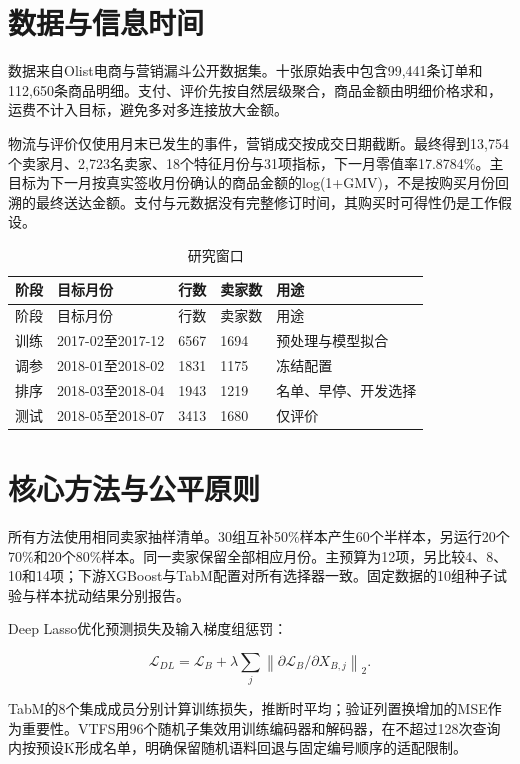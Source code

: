 \documentclass[UTF8,12pt,a4paper]{ctexart}
\begin{document}
\section{数据与信息时间}

数据来自Olist电商与营销漏斗公开数据集\cite{olist2018,funnel2018}。十张原始表中包含99,441条订单和112,650条商品明细。支付、评价先按自然层级聚合，商品金额由明细价格求和，运费不计入目标，避免多对多连接放大金额。

物流与评价仅使用月末已发生的事件，营销成交按成交日期截断。最终得到13,754个卖家月、2,723名卖家、18个特征月份与31项指标，下一月零值率17.8784\%。主目标为下一月按真实签收月份确认的商品金额的log(1+GMV)，不是按购买月份回溯的最终送达金额。支付与元数据没有完整修订时间，其购买时可得性仍是工作假设。

{
\footnotesize
\begin{longtable}[]{@{}lllll@{}}
\caption{研究窗口}\tabularnewline
\toprule\noalign{}
阶段 & 目标月份 & 行数 & 卖家数 & 用途 \\
\midrule\noalign{}
\endfirsthead
\toprule\noalign{}
阶段 & 目标月份 & 行数 & 卖家数 & 用途 \\
\midrule\noalign{}
\endhead
\bottomrule\noalign{}
\endlastfoot
训练 & 2017-02至2017-12 & 6567 & 1694 & 预处理与模型拟合 \\
调参 & 2018-01至2018-02 & 1831 & 1175 & 冻结配置 \\
排序 & 2018-03至2018-04 & 1943 & 1219 & 名单、早停、开发选择 \\
测试 & 2018-05至2018-07 & 3413 & 1680 & 仅评价 \\
\end{longtable}
}

\section{核心方法与公平原则}

所有方法使用相同卖家抽样清单。30组互补50\%样本产生60个半样本，另运行20个70\%和20个80\%样本。同一卖家保留全部相应月份。主预算为12项，另比较4、8、10和14项；下游XGBoost与TabM配置对所有选择器一致。固定数据的10组种子试验与样本扰动结果分别报告。

Deep Lasso优化预测损失及输入梯度组惩罚：

\[
\mathcal L_{DL}=\mathcal L_B+
\lambda\sum_j\left\|\partial\mathcal L_B/\partial X_{B,j}\right\|_2.
\]

TabM的8个集成成员分别计算训练损失，推断时平均；验证列置换增加的MSE作为重要性。VTFS用96个随机子集效用训练编码器和解码器，在不超过128次查询内按预设K形成名单，明确保留随机语料回退与固定编号顺序的适配限制。
\end{document}
